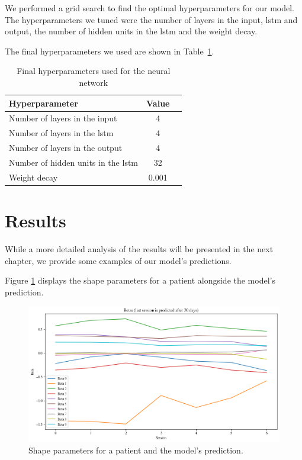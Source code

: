 We performed a grid search to find the optimal hyperparameters for our model.
The hyperparameters we tuned were the number of layers in the input, \gls{lstm}
and output, the number of hidden units in the \gls{lstm} and the weight decay.

The final hyperparameters we used are shown in
Table~\ref{tab:final-hyperparameters}.

\begin{table}[h]
    \centering
    \begin{tabular}{l c c}
        \toprule
        \textbf{Hyperparameter}                  & \textbf{Value} \\
        \midrule
        Number of layers in the input            & 4              \\
        Number of layers in the \gls{lstm}       & 4              \\
        Number of layers in the output           & 4              \\
        Number of hidden units in the \gls{lstm} & 32             \\
        Weight decay                             & 0.001          \\
        \bottomrule
    \end{tabular}
    \caption{Final hyperparameters used for the neural network}
    \label{tab:final-hyperparameters}
\end{table}

\section{Results}

While a more detailed analysis of the results will be presented in the next
chapter, we provide some examples of our model's predictions.

Figure \ref{fig:predicted-betas} displays the shape parameters for a patient
alongside the model's prediction.

\begin{figure}[h]
    \centering
    \includegraphics[width=\textwidth]{files/predicted_betas}
    \caption{Shape parameters for a patient and the model's prediction.}
    \label{fig:predicted-betas}
\end{figure}

